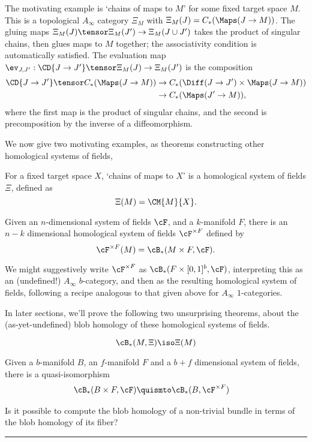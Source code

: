 The motivating example is `chains of maps to $M$' for some fixed target space $M$. This is a topological $A_\infty$ category $\Xi_M$ with $\Xi_M(J) = C_*(\Maps(J \to M))$. The gluing maps $\Xi_M(J) \tensor \Xi_M(J') \to \Xi_M(J \cup J')$  takes the product of singular chains, then glues maps to $M$ together; the associativity condition is automatically satisfied. The evaluation map $\ev_{J,J'} : \CD{J \to J'} \tensor \Xi_M(J) \to \Xi_M(J')$ is the composition
\begin{align*}
\CD{J \to J'} \tensor C_*(\Maps(J \to M)) & \to C_*(\Diff(J \to J') \times \Maps(J \to M)) \\ & \to C_*(\Maps(J' \to M)),
\end{align*}
where the first map is the product of singular chains, and the second is precomposition by the inverse of a diffeomorphism.

We now give two motivating examples, as theorems constructing other homological systems of fields,


\begin{thm}
For a fixed target space $X$, `chains of maps to $X$' is a homological system of fields $\Xi$, defined as
\begin{equation*}
\Xi(M) = \CM{M}{X}.
\end{equation*}
\end{thm}

\begin{thm}
Given an $n$-dimensional system of fields $\cF$, and a $k$-manifold $F$, there is an $n-k$ dimensional homological system of fields $\cF^{\times F}$ defined by
\begin{equation*}
\cF^{\times F}(M) = \cB_*(M \times F, \cF).
\end{equation*}
\end{thm}
We might suggestively write $\cF^{\times F}$ as  $\cB_*(F \times [0,1]^b, \cF)$, interpreting this as an (undefined!) $A_\infty$ $b$-category, and then as the resulting homological system of fields, following a recipe analogous to that given above for $A_\infty$ $1$-categories.


In later sections, we'll prove the following two unsurprising theorems, about the (as-yet-undefined) blob homology of these homological systems of fields.


\begin{thm}
\begin{equation*}
\cB_*(M, \Xi) \iso \Xi(M)
\end{equation*}
\end{thm}

\begin{thm}
Given a $b$-manifold $B$, an $f$-manifold $F$ and a $b+f$ dimensional system of fields,
there is a quasi-isomorphism
\begin{align*}
\cB_*(B \times F, \cF) & \quismto \cB_*(B, \cF^{\times F})
\end{align*}
\end{thm}

\begin{question}
Is it possible to compute the blob homology of a non-trivial bundle in terms of the blob homology of its fiber?
\end{question}

\hrule

